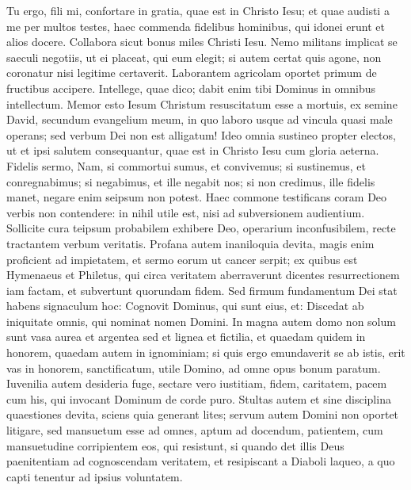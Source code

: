 \begin{biblechapter}
\begin{biblechapter}
\verse Tu ergo, fili mi, confortare in gratia, quae est in Christo Iesu; 
\verse et quae audisti a me per multos testes, haec commenda fidelibus hominibus, qui idonei erunt et alios docere.
 \verse Collabora sicut bonus miles Christi Iesu. 
\verse Nemo militans implicat se saeculi negotiis, ut ei placeat, qui eum elegit; 
\verse si autem certat quis agone, non coronatur nisi legitime certaverit. 
\verse Laborantem agricolam oportet primum de fructibus accipere. 
\verse Intellege, quae dico; dabit enim tibi Dominus in omnibus intellectum.
 \verse Memor esto Iesum Christum resuscitatum esse a mortuis, ex semine David, secundum evangelium meum, 
\verse in quo laboro usque ad vincula quasi male operans; sed verbum Dei non est alligatum! 
\verse Ideo omnia sustineo propter electos, ut et ipsi salutem consequantur, quae est in Christo Iesu cum gloria aeterna. 
\verse Fidelis sermo, Nam, si commortui sumus, et convivemus; 
\verse si sustinemus, et conregnabimus; si negabimus, et ille negabit nos; 
\verse si non credimus, ille fidelis manet, negare enim seipsum non potest.
 \verse Haec commone testificans coram Deo verbis non contendere: in nihil utile est, nisi ad subversionem audientium. 
\verse Sollicite cura teipsum probabilem exhibere Deo, operarium inconfusibilem, recte tractantem verbum veritatis. 
\verse Profana autem inaniloquia devita, magis enim proficient ad impietatem, 
\verse et sermo eorum ut cancer serpit; ex quibus est Hymenaeus et Philetus, 
\verse qui circa veritatem aberraverunt dicentes resurrectionem iam factam, et subvertunt quorundam fidem. 
\verse Sed firmum fundamentum Dei stat habens signaculum hoc: Cognovit Dominus, qui sunt eius, et: Discedat ab iniquitate omnis, qui nominat nomen Domini. 
\verse In magna autem domo non solum sunt vasa aurea et argentea sed et lignea et fictilia, et quaedam quidem in honorem, quaedam autem in ignominiam; 
\verse si quis ergo emundaverit se ab istis, erit vas in honorem, sanctificatum, utile Domino, ad omne opus bonum paratum.
 \verse Iuvenilia autem desideria fuge, sectare vero iustitiam, fidem, caritatem, pacem cum his, qui invocant Dominum de corde puro. 
\verse Stultas autem et sine disciplina quaestiones devita, sciens quia generant lites; 
\verse servum autem Domini non oportet litigare, sed mansuetum esse ad omnes, aptum ad docendum, patientem, 
\verse cum mansuetudine corripientem eos, qui resistunt, si quando det illis Deus paenitentiam ad cognoscendam veritatem, 
 \verse et resipiscant a Diaboli laqueo, a quo capti tenentur ad ipsius voluntatem.
 

\end{biblechapter}
\end{biblechapter}
